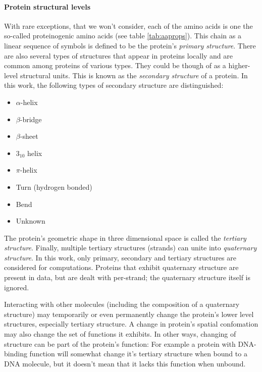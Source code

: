 \documentclass[11pt,twoside,a4paper]{book}
\begin{document}
\paragraph{Protein structural levels} With rare exceptions, that we won't consider, each of the amino acids is one the
so-called proteinogenic amino acids (see table \ref{tab:aaprops}). 
This chain as a linear sequence of symbols is defined to be the protein's \emph{primary structure}.
There are also several types of structures that appear in proteins locally and are common among
proteins of various types.
They could be though of as a higher-level structural units. This is known as the \emph{secondary structure}
of a protein. In this work, the following types of secondary structure are distinguished:
\begin{itemize}
 \item $\alpha$-helix
 \item $\beta$-bridge
 \item $\beta$-sheet
 \item $3_{10}$ helix
 \item $\pi$-helix
 \item Turn (hydrogen bonded)
 \item Bend
 \item Unknown
\end{itemize}
The protein's geometric shape in three dimensional space is called the \emph{tertiary structure}. 
Finally, multiple tertiary structures (strands) can unite into \emph{quaternary structure}.
In this work, only primary, secondary and tertiary structures are considered for computations.
Proteins that exhibit quaternary structure are present in data, but are dealt with per-strand; 
the quaternary structure itself is ignored.

Interacting with other molecules (including the composition of a quaternary structure)
may temporarily or even permanently change the protein's lower level structures,
especially tertiary structure.
A change in protein's spatial confomation may also change the set of functions
it exhibits. 
In other ways, changing of structure can be part of the protein's function:
For example a protein with DNA-binding function will somewhat change it's tertiary
structure when bound to a DNA molecule, but it doesn't mean that it lacks this
function when unbound.
\end{document}
